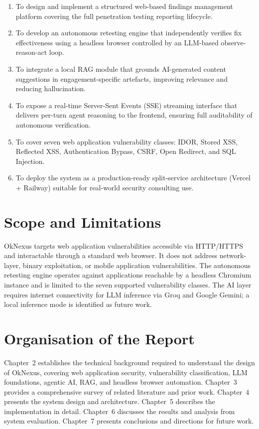\begin{enumerate}
    \item To design and implement a structured web-based findings management platform covering the full penetration testing reporting lifecycle.

    \item To develop an autonomous retesting engine that independently verifies fix effectiveness using a headless browser controlled by an LLM-based observe-reason-act loop.

    \item To integrate a local RAG module that grounds AI-generated content suggestions in engagement-specific artefacts, improving relevance and reducing hallucination.

    \item To expose a real-time Server-Sent Events (SSE) streaming interface that delivers per-turn agent reasoning to the frontend, ensuring full auditability of autonomous verification.

    \item To cover seven web application vulnerability classes: IDOR, Stored XSS, Reflected XSS, Authentication Bypass, CSRF, Open Redirect, and SQL Injection.

    \item To deploy the system as a production-ready split-service architecture (Vercel + Railway) suitable for real-world security consulting use.
\end{enumerate}

\section{Scope and Limitations}

OkNexus targets web application vulnerabilities accessible via HTTP/HTTPS and interactable through a standard web browser. It does not address network-layer, binary exploitation, or mobile application vulnerabilities. The autonomous retesting engine operates against applications reachable by a headless Chromium instance and is limited to the seven supported vulnerability classes. The AI layer requires internet connectivity for LLM inference via Groq and Google Gemini; a local inference mode is identified as future work.

\section{Organisation of the Report}

Chapter~2 establishes the technical background required to understand the design of OkNexus, covering web application security, vulnerability classification, LLM foundations, agentic AI, RAG, and headless browser automation. Chapter~3 provides a comprehensive survey of related literature and prior work. Chapter~4 presents the system design and architecture. Chapter~5 describes the implementation in detail. Chapter~6 discusses the results and analysis from system evaluation. Chapter~7 presents conclusions and directions for future work.
